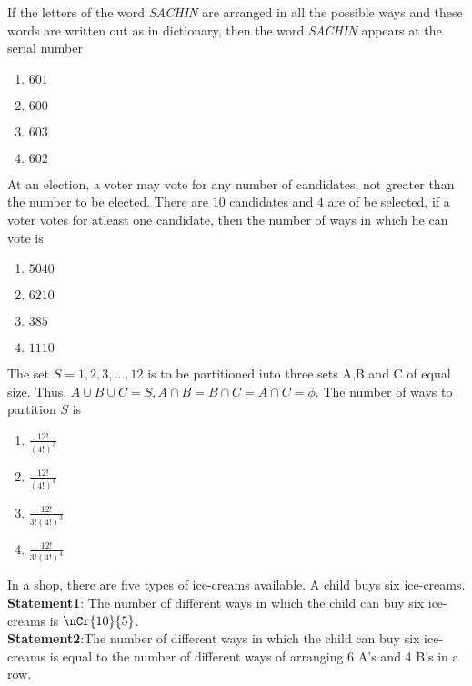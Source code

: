 \item If the letters of the word \emph{SACHIN} are arranged in all the possible ways and these words are written out as in dictionary, then the word \emph{SACHIN} appears at the serial number \hfill {}
	\begin{multicols}{4}
		\begin{enumerate}
     \item $601$
     \item $600$
     \item $603$
     \item $602$
 \end{enumerate}
	\end{multicols}
\item At an election, a voter may vote for any number of candidates, not greater than the number to be elected. There are $10$ candidates and $4$ are of be selected, if a voter votes for atleast one candidate, then the number of ways in which he can vote is \hfill{}
	\begin{multicols}{4}
        \begin{enumerate}
 \item $5040$
 \item $6210$
 \item $385$
 \item $1110$
        \end{enumerate}
	\end{multicols}
\item The set $S={1,2,3,...,12}$ is to be partitioned into three sets A,B and C of equal size. Thus, $A \cup B \cup C = S, A \cap B = B \cap C = A \cap C = \phi $. The number of ways to partition $S$ is \hfill{}
	\begin{multicols}{2}
	\begin{enumerate}
     \item $ \frac{12!}{(4!)^3}$
     \item $\frac{12!}{(4!)^4}$
     \item $\frac{12!}{3!(4!)^3}$
     \item $\frac{12!}{3!(4!)^4}$
        \end{enumerate}
	\end{multicols}
\item In a shop, there are five types of ice-creams available. A child buys six ice-creams.\\\textbf{Statement1}: The number of different ways in which the child can buy six ice-creams is $ \nCr{10}{5} $.\\\textbf{Statement2}:The number of different ways in which the child can buy six ice-creams is equal to the number of different ways of arranging 6 A's and 4 B's in a row. \hfill{}
